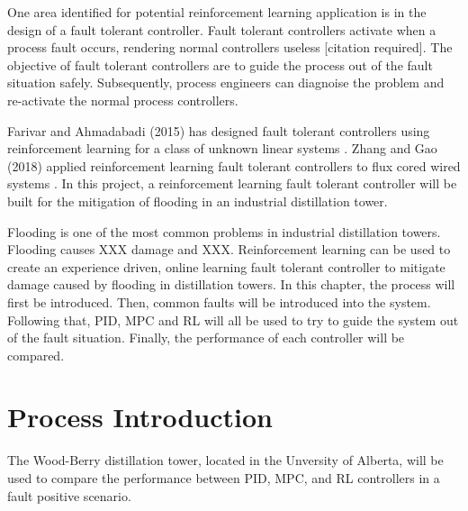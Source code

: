 One area identified for potential reinforcement learning application is in the design of a fault tolerant controller.  Fault tolerant controllers activate when a process fault occurs, rendering normal controllers useless [citation required]. The objective of fault tolerant controllers are to guide the process out of the fault situation safely.  Subsequently, process engineers can diagnoise the problem and re-activate the normal process controllers.  

Farivar and Ahmadabadi (2015) has designed fault tolerant controllers using reinforcement learning for a class of unknown linear systems \cite{ahmad}.  Zhang and Gao (2018) applied reinforcement learning fault tolerant controllers to flux cored wired systems \cite{zhang_gao}.  In this project, a reinforcement learning fault tolerant controller will be built for the mitigation of flooding in an industrial distillation tower. 

Flooding is one of the most common problems in industrial distillation towers.  Flooding causes XXX damage and XXX. Reinforcement learning can be used to create an experience driven, online learning fault tolerant controller to mitigate damage caused by flooding in distillation towers.  In this chapter, the process will first be introduced. Then, common faults will be introduced into the system.  Following that, PID, MPC and RL will all be used to try to guide the system out of the fault situation.  Finally, the performance of each controller will be compared.

\section{Process Introduction}
The Wood-Berry distillation tower, located in the Unversity of Alberta, will be used to compare the performance between PID, MPC, and RL controllers in a fault positive scenario.  


